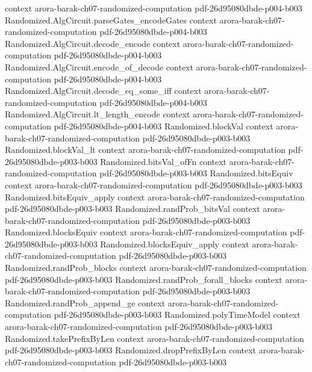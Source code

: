 \begin{theorem}
  {context}
  {arora-barak-ch07-randomized-computation}
  {pdf-26d95080dbde-p004-b003}
\proofstep
  {Randomized.AlgCircuit.parseGates_encodeGates}
  {context}
  {arora-barak-ch07-randomized-computation}
  {pdf-26d95080dbde-p004-b003}
\proofstep
  {Randomized.AlgCircuit.decode_encode}
  {context}
  {arora-barak-ch07-randomized-computation}
  {pdf-26d95080dbde-p004-b003}
\proofstep
  {Randomized.AlgCircuit.encode_of_decode}
  {context}
  {arora-barak-ch07-randomized-computation}
  {pdf-26d95080dbde-p004-b003}
\proofstep
  {Randomized.AlgCircuit.decode_eq_some_iff}
  {context}
  {arora-barak-ch07-randomized-computation}
  {pdf-26d95080dbde-p004-b003}
\proofstep
  {Randomized.AlgCircuit.lt_length_encode}
  {context}
  {arora-barak-ch07-randomized-computation}
  {pdf-26d95080dbde-p004-b003}
\proofstep
  {Randomized.blockVal}
  {context}
  {arora-barak-ch07-randomized-computation}
  {pdf-26d95080dbde-p003-b003}
\proofstep
  {Randomized.blockVal_lt}
  {context}
  {arora-barak-ch07-randomized-computation}
  {pdf-26d95080dbde-p003-b003}
\proofstep
  {Randomized.bitsVal_ofFn}
  {context}
  {arora-barak-ch07-randomized-computation}
  {pdf-26d95080dbde-p003-b003}
\proofstep
  {Randomized.bitsEquiv}
  {context}
  {arora-barak-ch07-randomized-computation}
  {pdf-26d95080dbde-p003-b003}
\proofstep
  {Randomized.bitsEquiv_apply}
  {context}
  {arora-barak-ch07-randomized-computation}
  {pdf-26d95080dbde-p003-b003}
\proofstep
  {Randomized.randProb_bitsVal}
  {context}
  {arora-barak-ch07-randomized-computation}
  {pdf-26d95080dbde-p003-b003}
\proofstep
  {Randomized.blocksEquiv}
  {context}
  {arora-barak-ch07-randomized-computation}
  {pdf-26d95080dbde-p003-b003}
\proofstep
  {Randomized.blocksEquiv_apply}
  {context}
  {arora-barak-ch07-randomized-computation}
  {pdf-26d95080dbde-p003-b003}
\proofstep
  {Randomized.randProb_blocks}
  {context}
  {arora-barak-ch07-randomized-computation}
  {pdf-26d95080dbde-p003-b003}
\proofstep
  {Randomized.randProb_forall_blocks}
  {context}
  {arora-barak-ch07-randomized-computation}
  {pdf-26d95080dbde-p003-b003}
\proofstep
  {Randomized.randProb_append_ge}
  {context}
  {arora-barak-ch07-randomized-computation}
  {pdf-26d95080dbde-p003-b003}
\proofstep
  {Randomized.polyTimeModel}
  {context}
  {arora-barak-ch07-randomized-computation}
  {pdf-26d95080dbde-p003-b003}
\proofstep
  {Randomized.takePrefixByLen}
  {context}
  {arora-barak-ch07-randomized-computation}
  {pdf-26d95080dbde-p003-b003}
\proofstep
  {Randomized.dropPrefixByLen}
  {context}
  {arora-barak-ch07-randomized-computation}
  {pdf-26d95080dbde-p003-b003}
\proofstep

\end{theorem}
